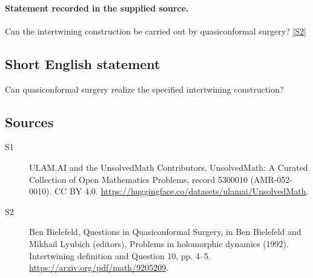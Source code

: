\documentclass[11pt]{article}
\newcommand{\sref}[2]{\hyperlink{source:#1:#2}{[S#2]}}
\begin{document}
\paragraph{Statement recorded in the supplied source.}
Can the intertwining construction be carried out by quasiconformal surgery? \sref{5300010}{2}
\subsection{Short English statement}
Can quasiconformal surgery realize the specified intertwining construction?
\subsection{Sources}
\begin{description}
\item[\hypertarget{source:5300010:1}{S1}] ULAM.AI and the UnsolvedMath Contributors, UnsolvedMath: A Curated Collection of Open Mathematics Problems, record 5300010 (AMR-052-0010). CC BY 4.0. \url{https://huggingface.co/datasets/ulamai/UnsolvedMath}.
\item[\hypertarget{source:5300010:2}{S2}] Ben Bielefeld, Questions in Quasiconformal Surgery, in Ben Bielefeld and Mikhail Lyubich (editors), Problems in holomorphic dynamics (1992). Intertwining definition and Question 10, pp. 4–5. \url{https://arxiv.org/pdf/math/9205209}.
\end{description}
\label{end:5300010}
\end{document}
